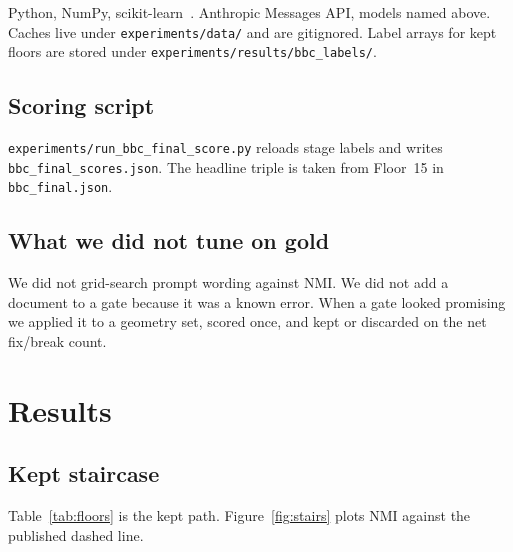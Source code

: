 \documentclass[11pt,a4paper]{article}
\begin{document}
Python, NumPy, scikit-learn~\cite{pedregosa2011sklearn}.
Anthropic Messages API, models named above. Caches live under
\texttt{experiments/data/} and are gitignored. Label arrays
for kept floors are stored under
\texttt{experiments/results/bbc\_labels/}.

\subsection{Scoring script}

\texttt{experiments/run\_bbc\_final\_score.py} reloads stage
labels and writes \texttt{bbc\_final\_scores.json}. The
headline triple is taken from Floor~15 in
\texttt{bbc\_final.json}.

\subsection{What we did not tune on gold}

We did not grid-search prompt wording against NMI. We did
not add a document to a gate because it was a known error.
When a gate looked promising we applied it to a geometry
set, scored once, and kept or discarded on the net fix/break
count.

\section{Results}

\subsection{Kept staircase}

Table~\ref{tab:floors} is the kept path. Figure~\ref{fig:stairs}
plots NMI against the published dashed line.
\end{document}
